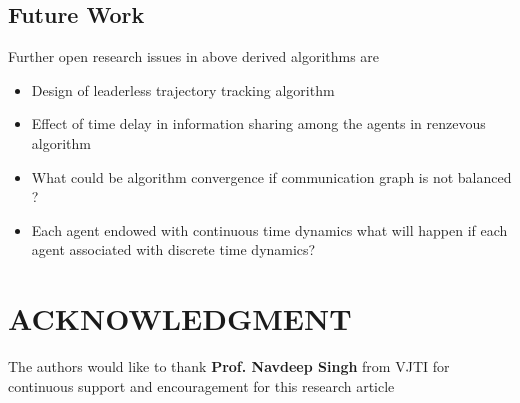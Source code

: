 \documentclass[twocolumn]{IETEJR}
\begin{document}
\subsection{Future Work}
Further open research issues in above derived algorithms are
\begin{itemize}
	\item Design of leaderless trajectory tracking algorithm
	\item Effect of time delay in information sharing among the agents in renzevous algorithm
	\item What could be algorithm convergence if communication graph is not balanced ?
	\item Each agent endowed with continuous time dynamics what will happen if each agent associated with discrete time dynamics? 
\end{itemize} 

\section*{ACKNOWLEDGMENT}
The authors would like to thank \textbf{Prof. Navdeep Singh} from VJTI for continuous support and encouragement for this research article
\end{document}
